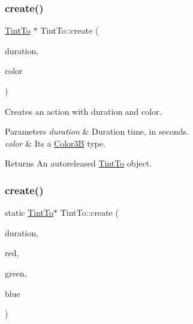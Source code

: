 \subsubsection{\texorpdfstring{create()}{create()}\hspace{0.1cm}{\footnotesize\ttfamily [2/4]}}
{\footnotesize\ttfamily \hyperlink{classTintTo}{Tint\+To} $\ast$ Tint\+To\+::create (\begin{DoxyParamCaption}\item[{float}]{duration,  }\item[{const \hyperlink{structColor3B}{Color3B} \&}]{color }\end{DoxyParamCaption})\hspace{0.3cm}{\ttfamily [static]}}

Creates an action with duration and color. 
\begin{DoxyParams}{Parameters}
{\em duration} & Duration time, in seconds. \\
\hline
{\em color} & It\textquotesingle{}s a \hyperlink{structColor3B}{Color3B} type. \\
\hline
\end{DoxyParams}
\begin{DoxyReturn}{Returns}
An autoreleased \hyperlink{classTintTo}{Tint\+To} object. 
\end{DoxyReturn}
\mbox{\label{classTintTo_afc53a16f4ddbf3482641f722ac8e4621}} 
\subsubsection{\texorpdfstring{create()}{create()}\hspace{0.1cm}{\footnotesize\ttfamily [3/4]}}
{\footnotesize\ttfamily static \hyperlink{classTintTo}{Tint\+To}$\ast$ Tint\+To\+::create (\begin{DoxyParamCaption}\item[{float}]{duration,  }\item[{G\+Lubyte}]{red,  }\item[{G\+Lubyte}]{green,  }\item[{G\+Lubyte}]{blue }\end{DoxyParamCaption})\hspace{0.3cm}{\ttfamily [static]}}

